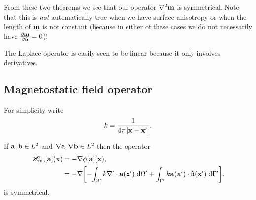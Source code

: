 From these two theorems we see that our operator $\lap \mv$ is symmetrical. Note that this is \emph{not} automatically true when we have surface anisotropy or when the length of $\mv$ is not constant (because in either of these cases we do not necessarily have $\ddn{\mv} = 0$)!

The Laplace operator is easily seen to be linear because it only involves derivatives.


\subsection{Magnetostatic field operator}

For simplicity write
\begin{equation}
  \knl = \frac{1}{4\pi \abs{\xv - \xv'}}.
\end{equation}

\begin{theorem}
  If $\av, \bv \in \ltwo$ and $\grad \av, \grad\bv \in \ltwo$ then the operator
  \begin{equation}
    \begin{aligned}
      \hmsop [\av](\xv) &= - \grad \phim[\av](\xv), \\
      &= -\grad \bigs{
              -\intd[\magd']{ \knl \grad' \cdot \av(\xv') }
              + \intd[\boundd']{\knl \av(\xv') \cdot \nv(\xv') }
            }.
    \end{aligned}
  \end{equation}
  is symmetrical.
\end{theorem}

